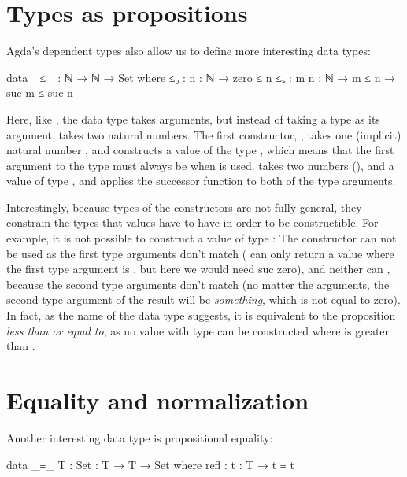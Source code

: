 	\section{Types as propositions}

		Agda's dependent types also allow us to define more interesting data
		types:

		\begin{code}
			data _≤_ : ℕ → ℕ → Set where
			  ≤₀ : {n : ℕ} → zero ≤ n
			  ≤ₛ : {m n : ℕ} → m ≤ n → suc m ≤ suc n
		\end{code}

		Here, like \codett{\_*}, the data type  takes arguments,
		but instead of taking a type as its argument,  takes two
		natural numbers. The first constructor, , takes one
		(implicit) natural number , and constructs a value of the
		type , which means that the first argument to the type
		must always be  when  is used. 
		takes two numbers (), and a value of type ,
		and applies the successor function to both of the type arguments.

		Interestingly, because types of the constructors are not fully general,
		they constrain the types that values have to have in order to be
		constructible. For example, it is not possible to construct a value of
		type : The constructor  can not be
		used as the first type arguments don't match ( can only
		return a value where the first type argument is , but here
		we would need suc zero), and neither can , because the
		second type arguments don't match (no matter the arguments, the second
		type argument of the result will be  \emph{something},
		which is not equal to zero). In fact, as the name of the data type
		suggests, it is equivalent to the proposition \emph{less than or equal
		to}, as no value with type  can be constructed where
		 is greater than .

	\section{Equality and normalization}

		Another interesting data type is propositional equality:

		\begin{code}
			data _≡_ {T : Set} : T → T → Set where
			  refl : {t : T} → t ≡ t
		\end{code}

